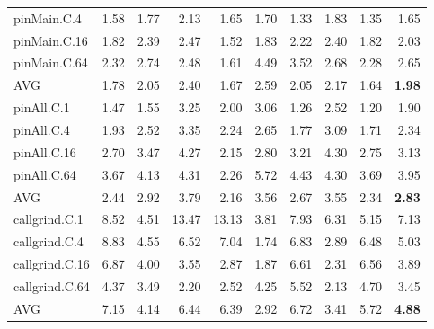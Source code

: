 \begin{table*}[]
\begin{center}
\begin{tabular}{|l|rrrrrrrr|r|}
 pinMain.C.4    & 1.58 & 1.77 &  2.13 &  1.65 & 1.70 & 1.33 & 1.83 & 1.35 & 1.65 \\
 pinMain.C.16   & 1.82 & 2.39 &  2.47 &  1.52 & 1.83 & 2.22 & 2.40 & 1.82 & 2.03 \\
 pinMain.C.64   & 2.32 & 2.74 &  2.48 &  1.61 & 4.49 & 3.52 & 2.68 & 2.28 & 2.65 \\
 \hline
 AVG            & 1.78 & 2.05 &  2.40 &  1.67 & 2.59 & 2.05 & 2.17 & 1.64 & \textbf{1.98} \\
 \hline
 pinAll.C.1     & 1.47 & 1.55 &  3.25 &  2.00 & 3.06 & 1.26 & 2.52 & 1.20 & 1.90 \\
 pinAll.C.4     & 1.93 & 2.52 &  3.35 &  2.24 & 2.65 & 1.77 & 3.09 & 1.71 & 2.34 \\
 pinAll.C.16    & 2.70 & 3.47 &  4.27 &  2.15 & 2.80 & 3.21 & 4.30 & 2.75 & 3.13 \\
 pinAll.C.64    & 3.67 & 4.13 &  4.31 &  2.26 & 5.72 & 4.43 & 4.30 & 3.69 & 3.95 \\
 \hline
 AVG            & 2.44 & 2.92 &  3.79 &  2.16 & 3.56 & 2.67 & 3.55 & 2.34 & \textbf{2.83} \\
 \hline
 callgrind.C.1  & 8.52 & 4.51 & 13.47 & 13.13 & 3.81 & 7.93 & 6.31 & 5.15 & 7.13 \\
 callgrind.C.4  & 8.83 & 4.55 &  6.52 &  7.04 & 1.74 & 6.83 & 2.89 & 6.48 & 5.03 \\
 callgrind.C.16 & 6.87 & 4.00 &  3.55 &  2.87 & 1.87 & 6.61 & 2.31 & 6.56 & 3.89 \\
 callgrind.C.64 & 4.37 & 3.49 &  2.20 &  2.52 & 4.25 & 5.52 & 2.13 & 4.70 & 3.45 \\
 \hline
 AVG            & 7.15 & 4.14 &  6.44 &  6.39 & 2.92 & 6.72 & 3.41 & 5.72 & \textbf{4.88} \\
\hline
\end{tabular}
\end{center}
\end{table*}
\fi






\iftrue

